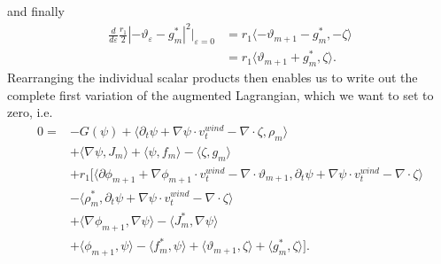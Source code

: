 and finally
\begin{align*}
	\frac{d}{d\varepsilon}\frac{r_1}{2}|-\vartheta_\varepsilon - g_m^*|^2\Big\lvert_{\varepsilon = 0} &=r_1\langle-\vartheta_{m+1}-g_m^*,-\zeta\rangle\\
																										&=r_1\langle\vartheta_{m+1}+g_m^*,\zeta\rangle.
\end{align*}
Rearranging the individual scalar products then enables us to write out the complete first variation of the augmented Lagrangian, which we want to set to zero, i.e.
\begin{align*}
	0 = &-G(\psi) + \langle\partial_t\psi + \nabla\psi \cdot v_t^{wind} - \nabla \cdot \zeta,\rho_m\rangle\\
		&+\langle\nabla\psi, J_m\rangle + \langle\psi,f_m\rangle - \langle\zeta, g_m\rangle\\
		&+r_1\Big[\Big\langle\partial\phi_{m+1} + \nabla\phi_{m+1}\cdot v_t^{wind} - \nabla \cdot \vartheta_{m+1},\partial_t\psi + \nabla\psi \cdot v_t^{wind} - \nabla \cdot \zeta\Big\rangle\\
		&-\langle\rho_m^*,\partial_t\psi + \nabla\psi \cdot v_t^{wind}-\nabla \cdot\zeta\rangle\\
		&+\langle\nabla\phi_{m+1},\nabla\psi\rangle - \langle J_m^*,\nabla\psi\rangle\\
		&+\langle\phi_{m+1},\psi\rangle - \langle f_m^*,\psi\rangle + \langle\vartheta_{m+1},\zeta\rangle + \langle g_m^*,\zeta\rangle\Big].
\end{align*}

